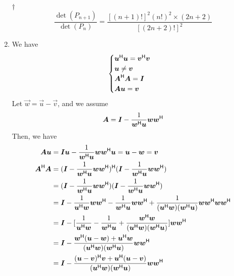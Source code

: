 \documentclass[a4paper,12pt]{article}
\begin{document}
\begin{enumerate}
\begin{answer}{$\dag$}
\begin{equation}
            \frac{\det(P_{n + 1})}{\det(P_{n})} = \frac{[(n + 1)!]^2(n!)^2 \times (2n + 2)}{[(2n + 2)!]^2}
        \end{equation}
    \end{answer}
    \item We have \begin{equation}
        \begin{cases}
            \boldsymbol{u}^{\mathsf{H}}\boldsymbol{u} = \boldsymbol{v}^{\mathsf{H}}\boldsymbol{v} \\
            \boldsymbol{u} \neq \boldsymbol{v} \\
            \boldsymbol{A}^{\mathsf{H}}\boldsymbol{A} = \boldsymbol{I} \\
            \boldsymbol{A}\boldsymbol{u} = \boldsymbol{v}
        \end{cases}
    \end{equation} Let $\vec{w} = \vec{u} - \vec{v}$, and we assume \begin{equation}
        \boldsymbol{A} = \boldsymbol{I} - \frac{1}{\boldsymbol{w}^{\mathsf{H}}\boldsymbol{u}}\boldsymbol{w}\boldsymbol{w}^{\mathsf{H}}
    \end{equation} Then, we have \begin{equation}
        \begin{aligned}
            \mat{A}\vec{u} & = \mat{I}\vec{u} - \frac{1}{\vec{w}\herm\vec{u}}\vec{w}\vec{w}\herm\vec{u} = \vec{u} - \vec{w} = \vec{v} \\
            \mat{A}\herm\mat{A} & = (\mat{I} - \frac{1}{\vec{w}\herm\vec{u}}\vec{w}\vec{w}\herm)\herm(\mat{I} - \frac{1}{\vec{w}\herm\vec{u}}\vec{w}\vec{w}\herm) \\
            & = (\mat{I} - \frac{1}{\vec{w}\herm\vec{u}}\vec{w}\vec{w}\herm)(\mat{I} - \frac{1}{\vec{w}\herm\vec{u}}\vec{w}\vec{w}\herm) \\
            & = \mat{I} - \frac{1}{\vec{u}\herm\vec{w}}\vec{w}\vec{w}\herm - \frac{1}{\vec{w}\herm\vec{u}}\vec{w}\vec{w}\herm + \frac{1}{(\vec{u}\herm\vec{w})(\vec{w}\herm\vec{u})}\vec{w}\vec{w}\herm\vec{w}\vec{w}\herm \\
            & = \mat{I} - [\frac{1}{\vec{u}\herm\vec{w}} - \frac{1}{\vec{w}\herm\vec{u}} + \frac{\vec{w}\herm\vec{w}}{(\vec{u}\herm\vec{w})(\vec{w}\herm\vec{u})}]\vec{w}\vec{w}\herm \\
            & = \mat{I} - \frac{\vec{w}\herm(\vec{u} - \vec{w}) + \vec{u}\herm\vec{w}}{(\vec{u}\herm\vec{w})(\vec{w}\herm\vec{u})}\vec{w}\vec{w}\herm \\
            & = \mat{I} - \frac{(\vec{u} - \vec{v})\herm\vec{v} + \vec{u}\herm(\vec{u} - \vec{v})}{(\vec{u}\herm\vec{w})(\vec{w}\herm\vec{u})}\vec{w}\vec{w}\herm \\

\end{aligned}
\end{equation}
\end{enumerate}
\end{document}
